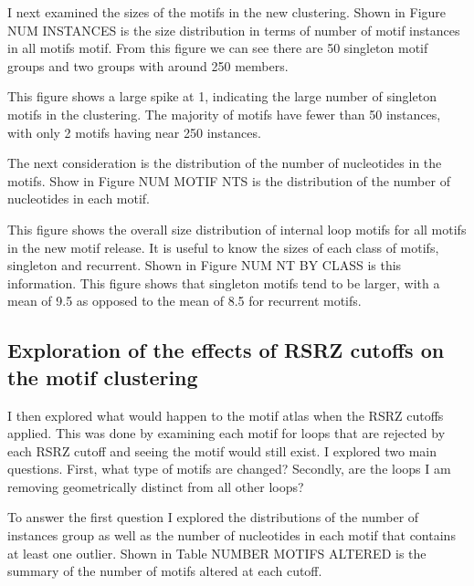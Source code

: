 I next examined the sizes of the motifs in the new clustering. Shown in Figure
NUM INSTANCES is the size distribution in terms of number of motif instances in
all motifs motif. From this figure we can see there are 50 singleton motif
groups and two groups with around 250 members. 

\begin{figure}
\end{figure}

This figure shows a large spike at 1, indicating the large number of singleton
motifs in the clustering. The majority of motifs have fewer than 50 instances,
with only 2 motifs having near 250 instances. 

The next consideration is the distribution of the number of nucleotides in the
motifs. Show in Figure NUM MOTIF NTS is the distribution of the number of
nucleotides in each motif. 

This figure shows the overall size distribution of internal loop motifs for all
motifs in the new motif release. It is useful to know the sizes of each class of
motifs, singleton and recurrent. Shown in Figure NUM NT BY CLASS is this
information. This figure shows that singleton motifs tend to be larger, with a
mean of 9.5 as opposed to the mean of 8.5 for recurrent motifs. 

\subsection{Exploration of the effects of RSRZ cutoffs on the motif clustering}

I then explored what would happen to the motif atlas when the RSRZ cutoffs
applied. This was done by examining each motif for loops that are rejected by
each RSRZ cutoff and seeing the motif would still exist. I explored two main
questions. First, what type of motifs are changed? Secondly, are the loops I am
removing geometrically distinct from all other loops? 

To answer the first question I explored the distributions of the number of
instances group as well as the number of nucleotides in each motif  that
contains at least one outlier. Shown in Table NUMBER MOTIFS ALTERED is the
summary of the number of motifs altered at each cutoff. 

\begin{table}
  \caption{A table showing the number of motifs for singletons vs recurrent
    motifs with rejected loops for each cutoff tested here. The counts are the
    number of loops rejected by each cutoff while the percents in the
    parenthesis are the fraction of all motifs of that type that are are
    affected by the cutoff. The upper left column indicates that there are 120
    total motifs that contain rejected loops, and this is 46%
    motifs, while the column to the right indicates that 33%
  singleton motifs are rejected by the RSRZ > 1 cutoff.}
\end{table}

